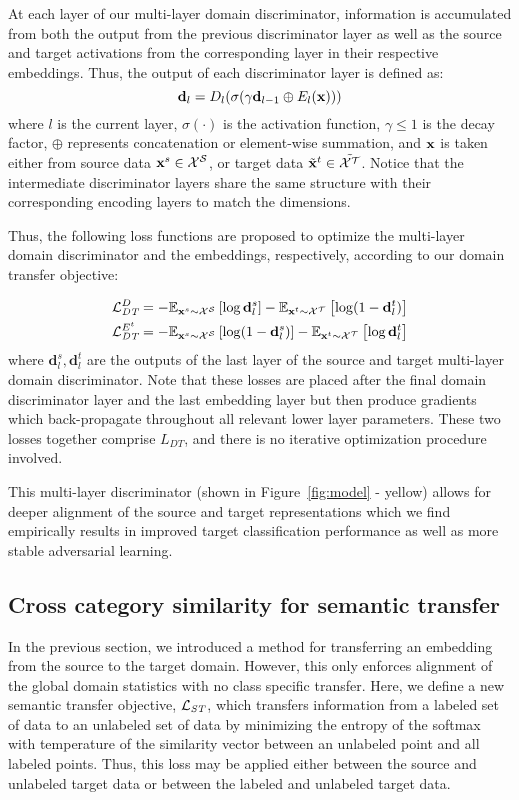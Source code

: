 At each layer of our multi-layer domain discriminator, information is accumulated from both the output from the previous discriminator layer as well as the source and target activations from the corresponding layer in their respective embeddings. Thus, the output of each discriminator layer is defined as: 
\begin{equation}
\mathbf{d}_l = D_{l}(\sigma(\gamma \mathbf{d}_{l-1}\oplus E_{l}(\mathbf{x})))
\end{equation}
where $l$ is the current layer, $\sigma(\cdot)$ is the activation function, $\gamma \le 1$ is the decay factor, $\oplus$ represents concatenation or element-wise summation, and $\mathbf{x}$ is taken either from source data $\mathbf{x}^{s} \in \mathcal{X}^{\mathcal{S}}$, or target data $\tilde{\mathbf{x}}^{t} \in \tilde{\mathcal{X}^{\mathcal{T}}} $. Notice that the intermediate discriminator layers share the same structure with their corresponding encoding layers to match the dimensions.

Thus, the following loss functions are proposed to optimize the multi-layer domain discriminator and the embeddings, respectively, according to our domain transfer objective:

\begin{align}
\mathcal{L}_{\textit{DT}}^{D} &= -\mathbb{E}_{\mathbf{x}^{s} \sim \mathcal{X}^{\mathcal{S}}}\left[\log \mathbf{d}_{l}^s \right]-\mathbb{E}_{\mathbf{x}^{t}\sim \mathcal{X}^{\mathcal{T}}}\left[\log (1-\mathbf{d}_{l}^t)\right]
\\
\mathcal{L}_{\textit{DT}}^{E^{t}} &= -\mathbb{E}_{\mathbf{x}^{s}\sim\mathcal{X}^{\mathcal{S}}}\left[\log( 1- \mathbf{d}_{l}^s)\right]-\mathbb{E}_{\mathbf{x}^{t} \sim\mathcal{X}^{\mathcal{T}}}\left[\log \mathbf{d}_{l}^t\right]
\end{align}
where $\mathbf{d}_{l}^s, \mathbf{d}_{l}^t$ are the outputs of the last layer of the source and target multi-layer domain discriminator. Note that these losses are placed after the final domain discriminator layer and the last embedding layer but then produce gradients which back-propagate throughout all relevant lower layer parameters. These two losses together comprise $L_{DT}$, and there is no iterative optimization procedure involved.

This multi-layer discriminator (shown in Figure~\ref{fig:model} - yellow) allows for deeper alignment of the source and target representations which we find empirically results in improved target classification performance as well as more stable adversarial learning.


\subsection{Cross category similarity for semantic transfer}
In the previous section, we introduced a method for transferring an embedding from the source to the target domain. However, this only enforces alignment of the global domain statistics with no class specific transfer. Here, we define a new semantic transfer objective, $\mathcal{L}_{\textit{ST}}$, which transfers information from a labeled set of data to an unlabeled set of data by minimizing the entropy of the softmax with temperature of the similarity vector between an unlabeled point and all labeled points. Thus, this loss may be applied either between the source and unlabeled target data or between the labeled and unlabeled target data. 

